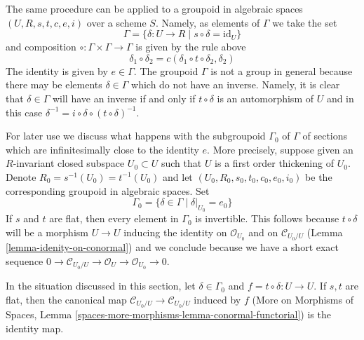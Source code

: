 \medskip\noindent
The same procedure can be applied to a groupoid in algebraic
spaces $(U, R, s, t, c, e, i)$ over a scheme $S$.
Namely, as elements of $\Gamma$ we take the set
$$
\Gamma = \{\delta : U \to R \mid s \circ \delta = \text{id}_U\}
$$
and composition $\circ : \Gamma \times \Gamma \to \Gamma$
is given by the rule above
\begin{equation}
\label{equation-composition}
\delta_1 \circ \delta_2 = c(\delta_1 \circ t \circ \delta_2, \delta_2)
\end{equation}
The identity is given by $e \in \Gamma$. The groupoid $\Gamma$ is not a
group in general because there may be elements $\delta \in \Gamma$
which do not have an inverse. Namely, it is clear that $\delta \in \Gamma$
will have an inverse if and only if $t \circ \delta$ is an automorphism
of $U$ and in this case
$\delta^{-1} = i \circ \delta \circ (t \circ \delta)^{-1}$.

\medskip\noindent
For later use we discuss what happens with the subgroupoid
$\Gamma_0$ of $\Gamma$ of sections which are infinitesimally
close to the identity $e$. More precisely, suppose given an
$R$-invariant closed subspace $U_0 \subset U$ such that $U$
is a first order thickening of $U_0$. Denote
$R_0 = s^{-1}(U_0) = t^{-1}(U_0)$ and let
$(U_0, R_0, s_0, t_0, c_0, e_0, i_0)$ be the corresponding
groupoid in algebraic spaces. Set
$$
\Gamma_0 = \{\delta \in \Gamma \mid \delta|_{U_0} = e_0\}
$$
If $s$ and $t$ are flat, then every element in $\Gamma_0$
is invertible. This follows because $t \circ \delta$
will be a morphism $U \to U$ inducing the identity on
$\mathcal{O}_{U_0}$ and on $\mathcal{C}_{U_0/U}$
(Lemma \ref{lemma-idenity-on-conormal})
and we conclude because we have a short exact
sequence
$0 \to \mathcal{C}_{U_0/U} \to \mathcal{O}_U \to \mathcal{O}_{U_0} \to 0$.

\begin{lemma}
\label{lemma-idenity-on-conormal}
In the situation discussed in this section, let $\delta \in \Gamma_0$
and $f = t \circ \delta : U \to U$. If $s, t$ are flat, then the
canonical map $\mathcal{C}_{U_0/U} \to \mathcal{C}_{U_0/U}$ induced by $f$
(More on Morphisms of Spaces, Lemma
\ref{spaces-more-morphisms-lemma-conormal-functorial})
is the identity map.
\end{lemma}

